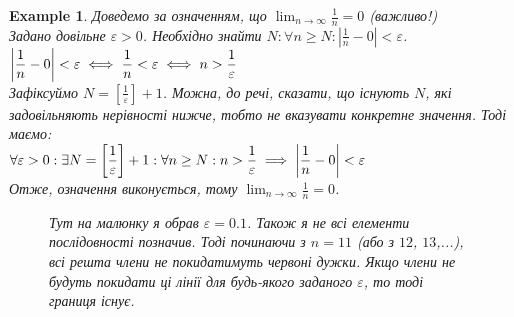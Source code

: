 \documentclass[a4paper, 14pt]{article}
\theoremstyle{theoremdd}
\theoremstyle{theoremdd}
\theoremstyle{theoremdd}
\theoremstyle{theoremdd}
\newtheorem{example}[theorem]{Example}
\theoremstyle{theoremdd}
\theoremstyle{theoremdd}
\theoremstyle{theoremdd}
\theoremstyle{theoremdd}
\begin{document}
	\begin{example}
	Доведемо за означенням, що $\displaystyle\lim_{n \to \infty} \frac{1}{n} = 0$ (важливо!)\\
	Задано довільне $\varepsilon > 0$. Необхідно знайти $\displaystyle N: \forall n \geq N: \left|\frac{1}{n}-0 \right|<\varepsilon$.\\
	$\displaystyle \abs{\frac{1}{n} - 0} < \varepsilon \iff \displaystyle \frac{1}{n}<\varepsilon \iff n > \frac{1}{\varepsilon}$\\
	Зафіксуймо $\displaystyle N = \left[\frac{1}{\varepsilon} \right] + 1$. Можна, до речі, сказати, що існують $N$, які задовільняють нерівності нижче, тобто не вказувати конкретне значення. Тоді маємо:\\
	$\forall \varepsilon > 0: \exists N = \displaystyle \left[\frac{1}{\varepsilon} \right] + 1: \forall n \geq N: n > \frac{1}{\varepsilon} \implies \abs{\frac{1}{n} - 0} < \varepsilon$\\
	Отже, означення виконується, тому $\displaystyle\lim_{n \to \infty} \frac{1}{n} = 0$.
	\begin{figure}[H]
	\centering
	\resizebox{0.8\textwidth}{!} {
}
	\caption*{Тут на малюнку я обрав $\varepsilon = 0.1$. Також я не всі елементи послідовності позначив. Тоді починаючи з $n=11$ (або з $12$, $13$,...), всі решта члени не покидатимуть червоні дужки. Якщо члени не будуть покидати ці лінії для будь-якого заданого $\varepsilon$, то тоді границя існує.}
	\end{figure}
	\end{example}
\end{document}
